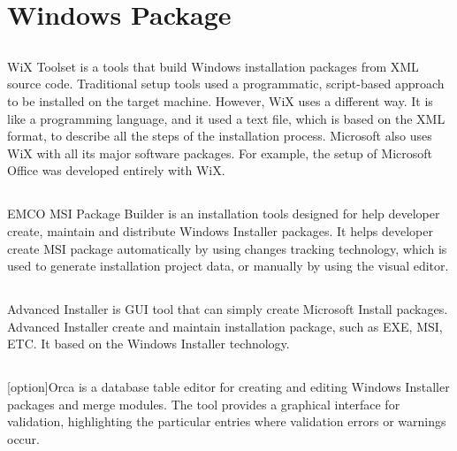 \section{Windows Package}

\subsection{}
WiX Toolset is a tools that build Windows installation packages from XML source code. Traditional setup tools used a programmatic, script-based approach to be installed on the target machine. However, WiX uses a different way. It is like a programming language, and it used a text file, which is based on the XML format, to describe all the steps of the installation process. Microsoft also uses WiX with all its major software packages. For example, the setup of Microsoft Office was developed entirely with WiX.


\subsection{}
EMCO MSI Package Builder is an installation tools designed for help developer create, maintain and distribute Windows Installer packages. It helps developer create MSI package automatically by using changes tracking technology, which is used to generate installation project data, or manually by using the visual editor.



\subsection{}
Advanced Installer is GUI tool that can simply create Microsoft Install packages. Advanced Installer create and maintain installation package, such as EXE, MSI, ETC. It based on the Windows Installer technology. 

\subsection{}
[option]Orca is a database table editor for creating and editing Windows Installer packages and merge modules. The tool provides a graphical interface for validation, highlighting the particular entries where validation errors or warnings occur.